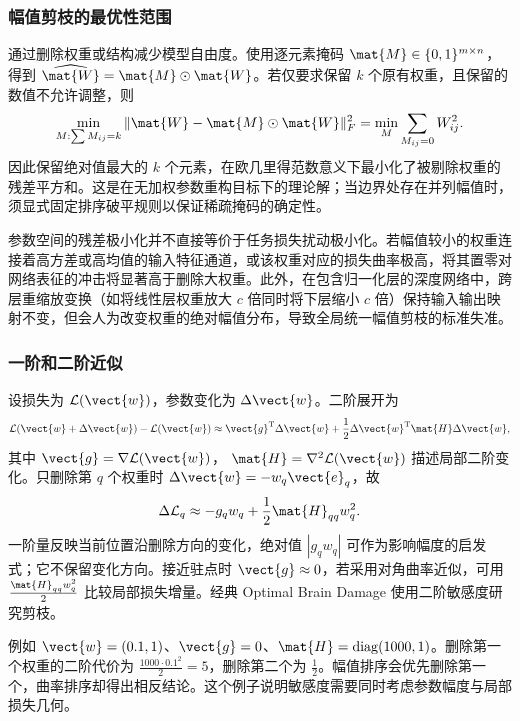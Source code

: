 \documentclass[../textbook.tex]{subfiles}
\begin{document}
\subsubsection{幅值剪枝的最优性范围}
通过删除权重或结构减少模型自由度。使用逐元素掩码 $\mat{M}\in\{0,1\}^{m\times n}$，得到 $\widehat{\mat{W}}=\mat{M}\odot \mat{W}$。若仅要求保留 $k$ 个原有权重，且保留的数值不允许调整，则
\begin{equation}
 \min_{M:\sum M_{ij}=k}\|\mat{W}-\mat{M}\odot \mat{W}\|_F^2
 =\min_M\sum_{M_{ij}=0}W_{ij}^2.
\end{equation}
因此保留绝对值最大的 $k$ 个元素，在欧几里得范数意义下最小化了被剔除权重的残差平方和。这是在无加权参数重构目标下的理论解；当边界处存在并列幅值时，须显式固定排序破平规则以保证稀疏掩码的确定性。

参数空间的残差极小化并不直接等价于任务损失扰动极小化。若幅值较小的权重连接着高方差或高均值的输入特征通道，或该权重对应的损失曲率极高，将其置零对网络表征的冲击将显著高于删除大权重。此外，在包含归一化层的深度网络中，跨层重缩放变换（如将线性层权重放大 $c$ 倍同时将下层缩小 $c$ 倍）保持输入输出映射不变，但会人为改变权重的绝对幅值分布，导致全局统一幅值剪枝的标准失准。

\subsubsection{一阶和二阶近似}
设损失为 $\mathcal L(\vect{w})$，参数变化为 $\Delta \vect{w}$。二阶展开为
\begin{equation}
 \mathcal L(\vect{w}+\Delta \vect{w})-\mathcal L(\vect{w})
 \approx \vect{g}^{\mathrm{T}}\Delta \vect{w}+\frac12\Delta \vect{w}^{\mathrm{T}} \mat{H}\Delta \vect{w},
\end{equation}
其中 $\vect{g}=\nabla\mathcal L(\vect{w})$， $\mat{H}=\nabla^2\mathcal L(\vect{w})$ 描述局部二阶变化。只删除第 $q$ 个权重时 $\Delta \vect{w}=-w_q\vect{e}_q$，故
\begin{equation}
 \Delta\mathcal L_q\approx-g_qw_q+\frac12\mat{H}_{qq}w_q^2.
 \label{eq:compress-sensitivity}
\end{equation}
一阶量反映当前位置沿删除方向的变化，绝对值 $|g_qw_q|$ 可作为影响幅度的启发式；它不保留变化方向。接近驻点时 $\vect{g}\approx0$，若采用对角曲率近似，可用 $\frac{\mat{H}_{qq}w_q^2}{2}$ 比较局部损失增量。经典 Optimal Brain Damage 使用二阶敏感度研究剪枝。\cite{lecun1989obd}

例如 $\vect{w}=(0.1,1)$、$\vect{g}=0$、$\mat{H}=\operatorname{diag}(1000,1)$。删除第一个权重的二阶代价为 $\frac{1000\cdot0.1^2}{2}=5$，删除第二个为 $\frac{1}{2}$。幅值排序会优先删除第一个，曲率排序却得出相反结论。这个例子说明敏感度需要同时考虑参数幅度与局部损失几何。
\end{document}
